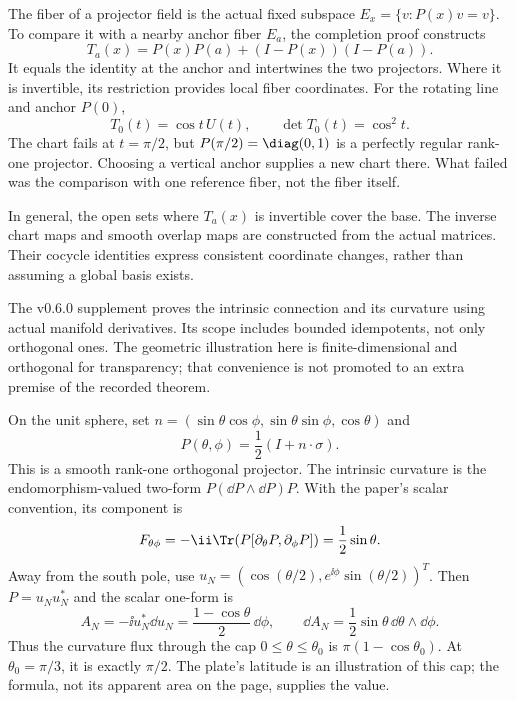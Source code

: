 The fiber of a projector field is the actual fixed subspace $E_x=\{v:P(x)v=v\}$. To compare it with a nearby anchor fiber $E_a$, the completion proof constructs
\[
T_a(x)=P(x)P(a)+(I-P(x))(I-P(a)).
\]
It equals the identity at the anchor and intertwines the two projectors. Where it is invertible, its restriction provides local fiber coordinates.
For the rotating line and anchor $P(0)$,
\[
T_0(t)=\cos t\,U(t),\qquad \det T_0(t)=\cos^2t.
\]
The chart fails at $t=\pi/2$, but $P(\pi/2)=\diag(0,1)$ is a perfectly regular rank-one projector. Choosing a vertical anchor supplies a new chart there. What failed was the comparison with one reference fiber, not the fiber itself.

In general, the open sets where $T_a(x)$ is invertible cover the base. The inverse chart maps and smooth overlap maps are constructed from the actual matrices. Their cocycle identities express consistent coordinate changes, rather than assuming a global basis exists.

The v0.6.0 supplement proves the intrinsic connection and its curvature using actual manifold derivatives. Its scope includes bounded idempotents, not only orthogonal ones. The geometric illustration here is finite-dimensional and orthogonal for transparency; that convenience is not promoted to an extra premise of the recorded theorem.

On the unit sphere, set $n=(\sin\theta\cos\phi,\sin\theta\sin\phi,\cos\theta)$ and
\[
P(\theta,\phi)=\frac12(I+n\cdot\sigma).
\]
This is a smooth rank-one orthogonal projector. The intrinsic curvature is the endomorphism-valued two-form $P(\dd P\wedge\dd P)P$. With the paper's scalar convention, its component is
\[
F_{\theta\phi}=-\ii\Tr\!\left(P[\partial_\theta P,\partial_\phi P]\right)
=\frac12\sin\theta.
\]
Away from the south pole, use $u_N=(\cos(\theta/2),e^{\ii\phi}\sin(\theta/2))^T$. Then $P=u_Nu_N^*$ and the scalar one-form is
\[
A_N=-\ii u_N^*\dd u_N=\frac{1-\cos\theta}{2}\,\dd\phi,
\qquad \dd A_N=\frac12\sin\theta\,\dd\theta\wedge\dd\phi.
\]
Thus the curvature flux through the cap $0\le\theta\le\theta_0$ is $\pi(1-\cos\theta_0)$. At $\theta_0=\pi/3$, it is exactly $\pi/2$. The plate's latitude is an illustration of this cap; the formula, not its apparent area on the page, supplies the value.

